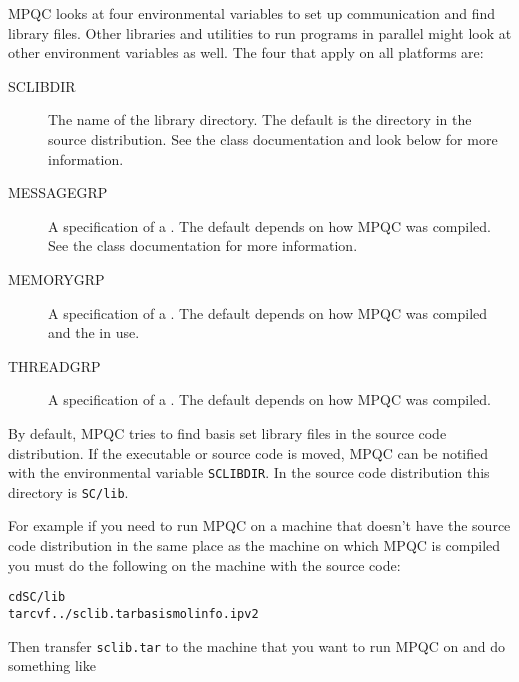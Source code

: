 MPQC looks at four environmental variables to set up
communication and find library files.  Other libraries
and utilities to run programs in parallel might look
at other environment variables as well.  The four that
apply on all platforms are:

\begin{description}
\item[{\ttfamily SCLIBDIR}] The name of the library directory.  The default
                      is the directory in the source distribution.  See the
                       class documentation and
                      look below for more information.
\item[{\ttfamily MESSAGEGRP}] A  specification of a
                       .
                      The default depends on how MPQC was compiled.  See
                      the  class documentation for
                      more information.
\item[{\ttfamily MEMORYGRP}] A  specification of a
                       .
                      The default depends on how MPQC was compiled and the
                       in use.
\item[{\ttfamily THREADGRP}] A  specification of a
                       .
                      The default depends on how MPQC was compiled.
\end{description}

By default, MPQC tries to find basis set library files in
the source code distribution.  If the executable or source
code is moved, MPQC can be notified with the environmental
variable \verb|SCLIBDIR|.  In the source code distribution
this directory is \verb|SC/lib|.

For example if you need to run MPQC on a machine that doesn't
have the source code distribution in the same place as the
machine on which MPQC is compiled you must do the following
on the machine with the source code:

\begin{alltt}
cd SC/lib
tar cvf ../sclib.tar basis molinfo.ipv2
\end{alltt}

Then transfer \verb|sclib.tar| to the machine that you want to run
MPQC on and do something like

